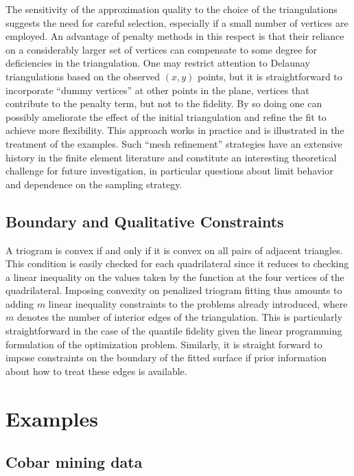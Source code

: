 The sensitivity of the approximation quality to the choice of the
triangulations suggests the need for careful selection, especially if a
small number of vertices are employed.  An advantage of penalty
methods in this respect is that their reliance on a considerably larger
set of vertices can compensate to some degree for deficiencies in the
triangulation. One may restrict attention to Delaunay triangulations based 
on the observed $(x,y)$ points, but it is straightforward to incorporate
``dummy vertices'' at other points in the plane, vertices that contribute
to the penalty term, but not to the fidelity. 
By so doing one can possibly ameliorate the effect of the initial
triangulation and refine the fit to achieve more flexibility.   This
approach works in practice and is illustrated in the treatment of the
examples.  Such ``mesh refinement'' strategies have an extensive history
in the finite element literature and constitute an interesting
theoretical challenge for future investigation, in particular questions
about limit behavior and dependence on the sampling strategy.



\subsection{Boundary and Qualitative Constraints}
A triogram is convex if and only if it is convex on all pairs of adjacent
triangles.  This condition is easily checked for each quadrilateral since it
reduces to checking a linear inequality on the values taken by the
function at the four vertices of the quadrilateral.  Imposing convexity
on penalized triogram fitting thus amounts to adding $m$ linear inequality
constraints to the problems already introduced, where $m$ denotes the
number of interior edges of the triangulation.  This is particularly
straightforward in the case of the quantile fidelity given the linear
programming formulation of the optimization problem.
Similarly, it is straight forward to impose constraints 
on the boundary of the fitted surface if prior information about how
to treat these edges is available.


\section{Examples}


\subsection{Cobar mining data}


